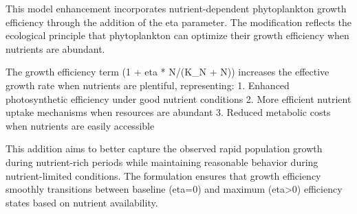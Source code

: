 This model enhancement incorporates nutrient-dependent phytoplankton growth efficiency through the addition of the eta parameter. The modification reflects the ecological principle that phytoplankton can optimize their growth efficiency when nutrients are abundant.

The growth efficiency term (1 + eta * N/(K_N + N)) increases the effective growth rate when nutrients are plentiful, representing:
1. Enhanced photosynthetic efficiency under good nutrient conditions
2. More efficient nutrient uptake mechanisms when resources are abundant
3. Reduced metabolic costs when nutrients are easily accessible

This addition aims to better capture the observed rapid population growth during nutrient-rich periods while maintaining reasonable behavior during nutrient-limited conditions. The formulation ensures that growth efficiency smoothly transitions between baseline (eta=0) and maximum (eta>0) efficiency states based on nutrient availability.
